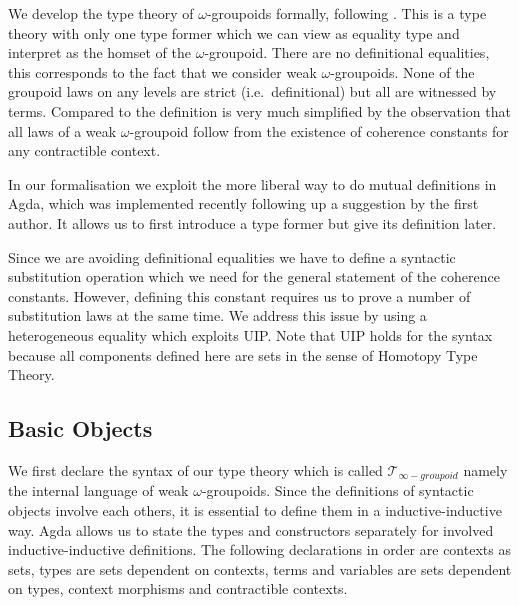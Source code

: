 \documentclass{sig-alternate}
\newcommand{\wog}{weak $\omega$-groupoids}
\newcommand{\tig}{$\mathcal{T}_{\infty-groupoid}$}
\begin{document}
We develop the type theory of $\omega$-groupoids formally, following
\cite{gb:wog}. This is a type theory with only one type former which
we can view as equality type and interpret as the homset of the
$\omega$-groupoid. There are no definitional equalities, this
corresponds to the fact that we consider weak $\omega$-groupoids. None of the groupoid laws on any levels are strict (i.e.\ definitional) but all are witnessed by
terms. Compared to \cite{txa:csl} the definition is very much
simplified by the observation that all laws of a weak $\omega$-groupoid follow from the existence of coherence constants for
any contractible context.

In our formalisation we exploit the more liberal way to do mutual
definitions in Agda, which was implemented recently following up a
suggestion by the first author. It allows us to first introduce a type
former but give its definition later.

Since we are avoiding definitional equalities we have to define a
syntactic substitution operation which we need for the general
statement of the coherence constants. However, defining this constant
requires us to prove a number of substitution laws at the same
time. We address this issue by using a heterogeneous equality which
exploits UIP. Note that UIP holds for
the syntax because all components defined here
are sets in the sense of Homotopy Type Theory.



\subsection{Basic Objects}

We first declare the syntax of our type theory which is
called \tig{} namely the internal language of \wog. Since the definitions of syntactic objects involve each others, it is essential to define them in a inductive-inductive way. Agda allows us to state the types and constructors separately for involved inductive-inductive definitions. The following declarations in order are contexts as sets,
types are sets dependent on contexts, terms and variables are sets
dependent on types, context morphisms and contractible contexts.
\end{document}
